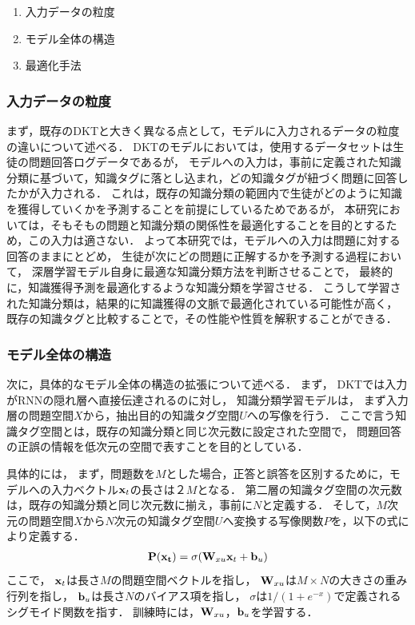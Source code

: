 \begin{enumerate}
	\item 入力データの粒度
	\item モデル全体の構造
	\item 最適化手法
\end{enumerate}


\subsubsection{入力データの粒度}
まず，既存のDKTと大きく異なる点として，モデルに入力されるデータの粒度の違いについて述べる．
DKTのモデルにおいては，使用するデータセットは生徒の問題回答ログデータであるが，
モデルへの入力は，事前に定義された知識分類に基づいて，知識タグに落とし込まれ，どの知識タグが紐づく問題に回答したかが入力される．
これは，既存の知識分類の範囲内で生徒がどのように知識を獲得していくかを予測することを前提にしているためであるが，
本研究においては，そもそもの問題と知識分類の関係性を最適化することを目的とするため，この入力は適さない．
よって本研究では，モデルへの入力は問題に対する回答のままにとどめ，
生徒が次にどの問題に正解するかを予測する過程において，
深層学習モデル自身に最適な知識分類方法を判断させることで，
最終的に，知識獲得予測を最適化するような知識分類を学習させる．
こうして学習された知識分類は，結果的に知識獲得の文脈で最適化されている可能性が高く，
既存の知識タグと比較することで，その性能や性質を解釈することができる．


\subsubsection{モデル全体の構造}
次に，具体的なモデル全体の構造の拡張について述べる．
まず，
DKTでは入力がRNNの隠れ層へ直接伝達されるのに対し，
知識分類学習モデルは，
まず入力層の問題空間$X$から，抽出目的の知識タグ空間$U$への写像を行う．
ここで言う知識タグ空間とは，既存の知識分類と同じ次元数に設定された空間で，
問題回答の正誤の情報を低次元の空間で表すことを目的としている．

具体的には，
まず，問題数を$M$とした場合，正答と誤答を区別するために，モデルへの入力ベクトル${\bf x}_t$の長さは$２M$となる．
第二層の知識タグ空間の次元数は，既存の知識分類と同じ次元数に揃え，事前に$N$と定義する．
そして，$M$次元の問題空間$X$から$N$次元の知識タグ空間$U$へ変換する写像関数$P$を，以下の式により定義する．
\begin{eqnarray}
{\bf P({\bf x}_t)} = \sigma( {\bf W}_{xu} {\bf x}_t + {\bf b}_u)
\end{eqnarray}
ここで，
${\bf x}_t$は長さ$M$の問題空間ベクトルを指し，
${\bf W}_{xu}$は$M \times N$の大きさの重み行列を指し，
${\bf b}_u$は長さ$N$のバイアス項を指し，
$\sigma$は$1 / (1 + e^{-x})$で定義されるシグモイド関数を指す．
訓練時には，${\bf W}_{xu}$，${\bf b}_u$を学習する．

